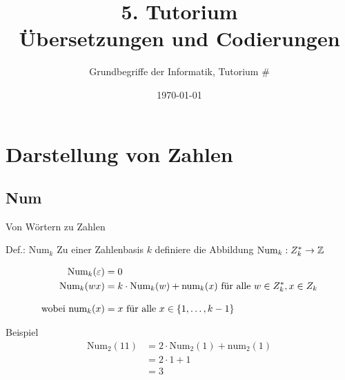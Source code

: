 



\title[Übersetzungen und Codierungen]{5. Tutorium\\ Übersetzungen und Codierungen}
\subtitle{Grundbegriffe der Informatik, Tutorium \#\mytutnumber}
\date{\today}

\usepackage[normalem]{ulem}


\titleframe
\roadmap


\section{Darstellung von Zahlen}

\subsection{Num}
\begin{frame}{Von Wörtern zu Zahlen}
	\begin{block}{Def.: $\text{Num}_k$}
		Zu einer Zahlenbasis $k$ definiere die Abbildung $\text{Num}_k : Z_k^* \to \mathbb{Z}$ 

		\begin{align*}
			\text{Num}_k(\varepsilon) &= 0 \\
			\text{Num}_k(wx) &= k\cdot \text{Num}_k(w) + \text{num}_k(x) \text{ für alle } w\in Z_k^*, x\in Z_k\\[2ex]
			\text{wobei }\text{num}_k(x) &= x \text{ für alle } x \in \left\{ 1,\dots,k-1 \right\}
		\end{align*}
	\end{block}
	\pause
	\begin{exampleblock}{Beispiel}
		\begin{align*}
			\text{Num}_2(11) &= 2\cdot \text{Num}_2(1) + \text{num}_2(1) \\
				&= 2\cdot 1 + 1 \\
				&= 3
		\end{align*}
	\end{exampleblock}
\end{frame}

